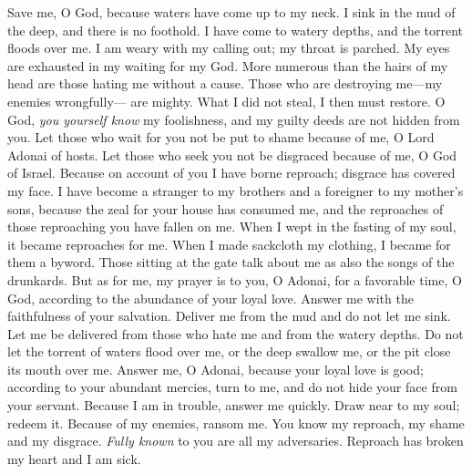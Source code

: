 \begin{biblechapter} %
 Save me, O God, 
because waters have come up to my neck.
\verse I sink in the mud of the deep, and there is no foothold. 
I have come to watery depths, 
and the torrent floods over me.
\verse I am weary with my calling out; my throat is parched. 
My eyes are exhausted in my waiting for my God.
\verse More numerous than the hairs of my head 
are those hating me without a cause. 
Those who are destroying me—my enemies wrongfully— are mighty. 
What I did not steal, I then must restore.
\verse O God, \textit{you yourself know} my foolishness, 
and my guilty deeds are not hidden from you.
\verse Let those who wait for you not be put to shame because of me, 
O Lord Adonai of hosts. 
Let those who seek you not be disgraced because of me, 
O God of Israel.
\verse Because on account of you I have borne reproach; 
disgrace has covered my face.
\verse I have become a stranger to my brothers 
and a foreigner to my mother’s sons,
\verse because the zeal for your house has consumed me, 
and the reproaches of those reproaching you have fallen on me.
\verse When I wept in the fasting of my soul, 
it became reproaches for me.
\verse When I made sackcloth my clothing, 
I became for them a byword.
\verse Those sitting at the gate talk about me 
as also the songs of the drunkards.
\verse But as for me, my prayer is to you, O Adonai, for a favorable time, 
O God, according to the abundance of your loyal love. 
Answer me with the faithfulness of your salvation.
\verse Deliver me from the mud and do not let me sink. 
Let me be delivered from those who hate me 
and from the watery depths.
\verse Do not let the torrent of waters flood over me, 
or the deep swallow me, 
or the pit close its mouth over me.
\verse Answer me, O Adonai, because your loyal love is good; 
according to your abundant mercies, turn to me,
\verse and do not hide your face from your servant. 
Because I am in trouble, answer me quickly.
\verse Draw near to my soul; redeem it. 
Because of my enemies, ransom me.
\verse You know my reproach, my shame and my disgrace. 
\textit{Fully known} to you are all my adversaries.
\verse Reproach has broken my heart and I am sick. 

\end{biblechapter}
